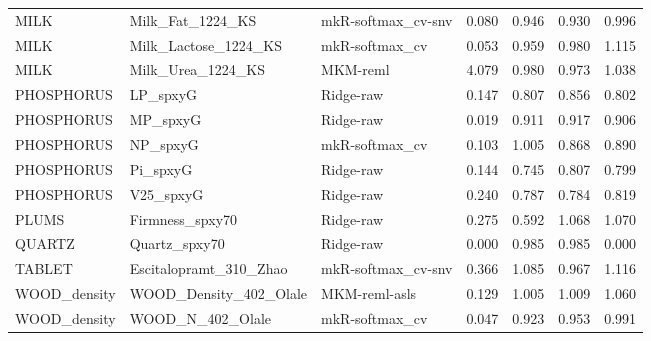 \begin{tabular}{lllrrrr}
MILK & Milk_Fat_1224_KS & mkR-softmax_cv-snv & 0.080 & 0.946 & 0.930 & 0.996 \\
MILK & Milk_Lactose_1224_KS & mkR-softmax_cv & 0.053 & 0.959 & 0.980 & 1.115 \\
MILK & Milk_Urea_1224_KS & MKM-reml & 4.079 & 0.980 & 0.973 & 1.038 \\
PHOSPHORUS & LP_spxyG & Ridge-raw & 0.147 & 0.807 & 0.856 & 0.802 \\
PHOSPHORUS & MP_spxyG & Ridge-raw & 0.019 & 0.911 & 0.917 & 0.906 \\
PHOSPHORUS & NP_spxyG & mkR-softmax_cv & 0.103 & 1.005 & 0.868 & 0.890 \\
PHOSPHORUS & Pi_spxyG & Ridge-raw & 0.144 & 0.745 & 0.807 & 0.799 \\
PHOSPHORUS & V25_spxyG & Ridge-raw & 0.240 & 0.787 & 0.784 & 0.819 \\
PLUMS & Firmness_spxy70 & Ridge-raw & 0.275 & 0.592 & 1.068 & 1.070 \\
QUARTZ & Quartz_spxy70 & Ridge-raw & 0.000 & 0.985 & 0.985 & 0.000 \\
TABLET & Escitalopramt_310_Zhao & mkR-softmax_cv-snv & 0.366 & 1.085 & 0.967 & 1.116 \\
WOOD_density & WOOD_Density_402_Olale & MKM-reml-asls & 0.129 & 1.005 & 1.009 & 1.060 \\
WOOD_density & WOOD_N_402_Olale & mkR-softmax_cv & 0.047 & 0.923 & 0.953 & 0.991 \\
\bottomrule
\end{tabular}
